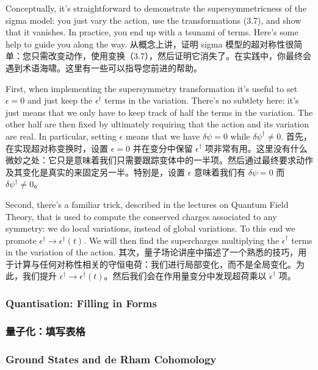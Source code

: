 \documentclass{article}
\begin{document}
\begin{paracol}{2}
Conceptually, it’s straightforward to demonstrate the supersymmetricness of the sigma model: you just vary the action, use the transformations (3.7), and show that it vanishes. In practice, you end up with a tsunami of terms. Here’s some help to guide you along the way.
\switchcolumn
从概念上讲，证明 sigma 模型的超对称性很简单：您只需改变动作，使用变换（3.7），然后证明它消失了。在实践中，你最终会遇到术语海啸。这里有一些可以指导您前进的帮助。
\switchcolumn*

First, when implementing the supersymmetry transformation it’s useful to set $\epsilon = 0$ and just keep the $\epsilon^{\dagger}$ terms in the variation. There’s no subtlety here: it’s just means that we only have to keep track of half the terms in the variation. The other half are then fixed by ultimately requiring that the action and its variation are real. In particular, setting $\epsilon$ means that we have $\delta \psi = 0$ while $\delta \psi^{\dagger} \neq 0$.
\switchcolumn
首先，在实现超对称变换时，设置 $\epsilon = 0$ 并在变分中保留 $\epsilon^{\dagger}$ 项非常有用。这里没有什么微妙之处：它只是意味着我们只需要跟踪变体中的一半项。然后通过最终要求动作及其变化是真实的来固定另一半。特别是，设置 $\epsilon$ 意味着我们有 $\delta \psi = 0$ 而 $\delta \psi^{\dagger} \neq 0$。
\switchcolumn*

Second, there’s a familiar trick, described in the lectures on Quantum Field Theory, that is used to compute the conserved charges associated to any symmetry: we do local variations, instead of global variations. To this end we promote $\epsilon^{\dagger} \to \epsilon^{\dagger}(t)$. We will then ﬁnd the supercharges multiplying the $\dot{\epsilon}^{\dagger}$ terms in the variation of the action.
\switchcolumn
其次，量子场论讲座中描述了一个熟悉的技巧，用于计算与任何对称性相关的守恒电荷：我们进行局部变化，而不是全局变化。为此，我们提升 $\epsilon^{\dagger} \to \epsilon^{\dagger}(t)$。然后我们会在作用量变分中发现超荷乘以 $\dot{\epsilon}^{\dagger}$ 项。
\switchcolumn*

\subsubsection{Quantisation: Filling in Forms}
\switchcolumn
\subsubsection*{量子化：填写表格}
\switchcolumn*

\subsubsection{Ground States and de Rham Cohomology}
\switchcolumn

\end{paracol}
\end{document}
